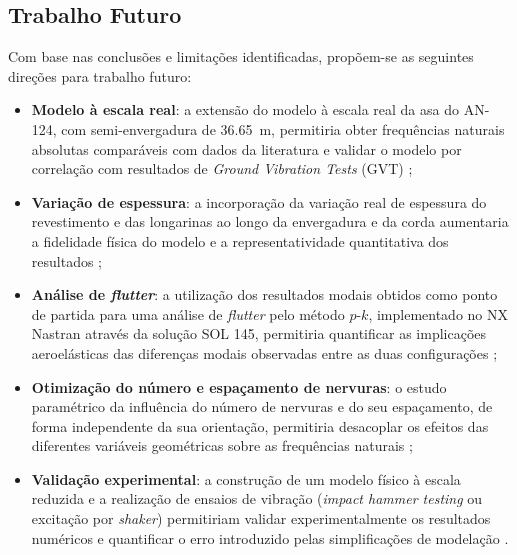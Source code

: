 \documentclass[a4paper,fleqn,noprintline]{cas-dc}
\begin{document}
\subsection{Trabalho Futuro}

Com base nas conclusões e limitações identificadas, propõem-se as seguintes direções para trabalho futuro:

\begin{itemize}
    \item \textbf{Modelo à escala real}: a extensão do modelo à escala real da asa do AN-124, com semi-envergadura de \SI{36.65}{\meter}, permitiria obter frequências naturais absolutas comparáveis com dados da literatura e validar o modelo por correlação com resultados de \textit{Ground Vibration Tests} (GVT) \cite{Ewins2000};

    \item \textbf{Variação de espessura}: a incorporação da variação real de espessura do revestimento e das longarinas ao longo da envergadura e da corda aumentaria a fidelidade física do modelo e a representatividade quantitativa dos resultados \cite{Niu1988};

    \item \textbf{Análise de \textit{flutter}}: a utilização dos resultados modais obtidos como ponto de partida para uma análise de \textit{flutter} pelo método $p$-$k$, implementado no NX Nastran através da solução SOL 145, permitiria quantificar as implicações aeroelásticas das diferenças modais observadas entre as duas configurações \cite{Nastran2014, Wright2015};

    \item \textbf{Otimização do número e espaçamento de nervuras}: o estudo paramétrico da influência do número de nervuras e do seu espaçamento, de forma independente da sua orientação, permitiria desacoplar os efeitos das diferentes variáveis geométricas sobre as frequências naturais \cite{Dowell2004};

    \item \textbf{Validação experimental}: a construção de um modelo físico à escala reduzida e a realização de ensaios de vibração (\textit{impact hammer testing} ou excitação por \textit{shaker}) permitiriam validar experimentalmente os resultados numéricos e quantificar o erro introduzido pelas simplificações de modelação \cite{Ewins2000, Maia1997}.
\end{itemize}

\printcredits

%





\end{document}
